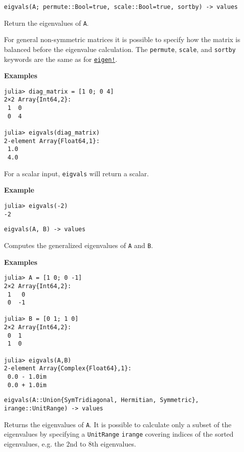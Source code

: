 \begin{adjustwidth}{2em}{0pt}


\begin{verbatim}
eigvals(A; permute::Bool=true, scale::Bool=true, sortby) -> values
\end{verbatim}

Return the eigenvalues of \texttt{A}.

For general non-symmetric matrices it is possible to specify how the matrix is balanced before the eigenvalue calculation. The \texttt{permute}, \texttt{scale}, and \texttt{sortby} keywords are the same as for \hyperlink{11207008815152064958}{\texttt{eigen!}}.

\textbf{Examples}


\begin{verbatim}
julia> diag_matrix = [1 0; 0 4]
2×2 Array{Int64,2}:
 1  0
 0  4

julia> eigvals(diag_matrix)
2-element Array{Float64,1}:
 1.0
 4.0
\end{verbatim}



For a scalar input, \texttt{eigvals} will return a scalar.

\textbf{Example}


\begin{verbatim}
julia> eigvals(-2)
-2
\end{verbatim}




\begin{lstlisting}
eigvals(A, B) -> values
\end{lstlisting}

Computes the generalized eigenvalues of \texttt{A} and \texttt{B}.

\textbf{Examples}


\begin{verbatim}
julia> A = [1 0; 0 -1]
2×2 Array{Int64,2}:
 1   0
 0  -1

julia> B = [0 1; 1 0]
2×2 Array{Int64,2}:
 0  1
 1  0

julia> eigvals(A,B)
2-element Array{Complex{Float64},1}:
 0.0 - 1.0im
 0.0 + 1.0im
\end{verbatim}




\begin{lstlisting}
eigvals(A::Union{SymTridiagonal, Hermitian, Symmetric}, irange::UnitRange) -> values
\end{lstlisting}

Returns the eigenvalues of \texttt{A}. It is possible to calculate only a subset of the eigenvalues by specifying a \texttt{UnitRange} \texttt{irange} covering indices of the sorted eigenvalues, e.g. the 2nd to 8th eigenvalues.



\end{adjustwidth}

